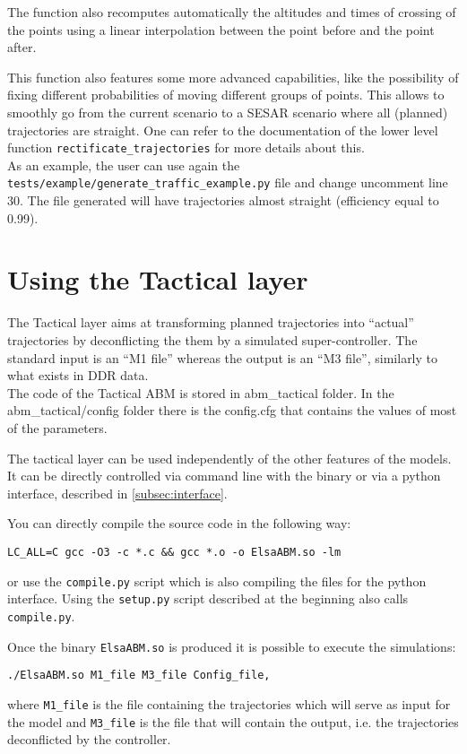 \documentclass[12pt]{article}
\begin{document}
The function also recomputes automatically the altitudes and times of crossing of the points using a linear interpolation between the point before and the point after.

This function also features some more advanced capabilities, like the possibility of fixing different probabilities of moving different groups of points. This allows to smoothly go from the current scenario to a SESAR scenario where all (planned) trajectories are straight. One can refer to the documentation of the lower level function  \verb|rectificate_trajectories| for more details about this.
\\

As an example, the user can use again the \verb|tests/example/generate_traffic_example.py| file and change uncomment line 30. The file generated will have trajectories almost straight (efficiency equal to 0.99).

\section{Using the Tactical layer}
The Tactical layer aims at transforming planned trajectories into ``actual'' trajectories by deconflicting the them by a simulated super-controller. The standard input is an ``M1 file'' whereas the output is an ``M3 file'', similarly to what exists in DDR data.
\\

The code of the Tactical ABM is stored in abm\_tactical folder. In the abm\_tactical/config folder there is the config.cfg that contains the values of most of the parameters.

The tactical layer can be used independently of the other features of the models. It can be directly controlled via command line with the binary or via a python interface, described in \ref{subsec:interface}.

You can directly compile the source code in the following way:

\begin{verbatim}
LC_ALL=C gcc -O3 -c *.c && gcc *.o -o ElsaABM.so -lm
\end{verbatim}
or use the \verb|compile.py| script which is also compiling the files for the python interface. Using the \verb|setup.py| script described at the beginning also calls \verb|compile.py|.

Once the binary \verb|ElsaABM.so| is produced it is possible to execute the simulations:

\begin{verbatim}
./ElsaABM.so M1_file M3_file Config_file,
\end{verbatim}
where \verb|M1_file| is the file containing the trajectories which will serve as input for the model and \verb|M3_file| is the file that will contain the output, i.e. the trajectories deconflicted by the controller.
\\
\end{document}

